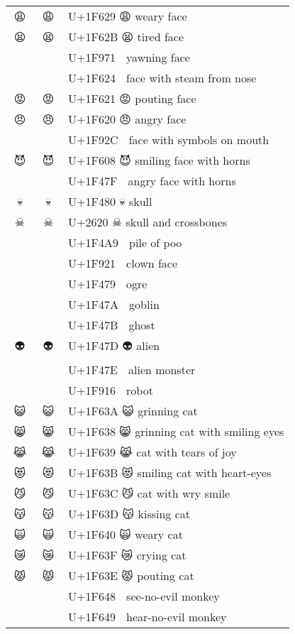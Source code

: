 \documentclass[a4paper,12pt]{article}
\newcommand{\fontA}[1]{{\fontspec[RawFeature={dist,ccmp}]{Segoe UI Emoji} #1}}
\newcommand{\fontB}[1]{{\fontspec[Ligatures=Common,RawFeature={+ccmp}]{Symbola_Hinted.ttf} #1}}
\begin{document}
\begin{longtable}[c]{ccp{0.8\linewidth}}
\fontA{😩}&\fontB{😩}&U+1F629 😩 weary face\\
\fontA{😫}&\fontB{😫}&U+1F62B 😫 tired face\\
\fontA{🥱}&\fontB{🥱}&U+1F971 🥱 yawning face\\
\fontA{😤}&\fontB{😤}&U+1F624 😤 face with steam from nose\\
\fontA{😡}&\fontB{😡}&U+1F621 😡 pouting face\\
\fontA{😠}&\fontB{😠}&U+1F620 😠 angry face\\
\fontA{🤬}&\fontB{🤬}&U+1F92C 🤬 face with symbols on mouth\\
\fontA{😈}&\fontB{😈}&U+1F608 😈 smiling face with horns\\
\fontA{👿}&\fontB{👿}&U+1F47F 👿 angry face with horns\\
\fontA{💀}&\fontB{💀}&U+1F480 💀 skull\\
\fontA{☠}&\fontB{☠}&U+2620 ☠ skull and crossbones\\
\fontA{💩}&\fontB{💩}&U+1F4A9 💩 pile of poo\\
\fontA{🤡}&\fontB{🤡}&U+1F921 🤡 clown face\\
\fontA{👹}&\fontB{👹}&U+1F479 👹 ogre\\
\fontA{👺}&\fontB{👺}&U+1F47A 👺 goblin\\
\fontA{👻}&\fontB{👻}&U+1F47B 👻 ghost\\
\fontA{👽}&\fontB{👽}&U+1F47D 👽 alien\\
\fontA{👾}&\fontB{👾}&U+1F47E 👾 alien monster\\
\fontA{🤖}&\fontB{🤖}&U+1F916 🤖 robot\\
\fontA{😺}&\fontB{😺}&U+1F63A 😺 grinning cat\\
\fontA{😸}&\fontB{😸}&U+1F638 😸 grinning cat with smiling eyes\\
\fontA{😹}&\fontB{😹}&U+1F639 😹 cat with tears of joy\\
\fontA{😻}&\fontB{😻}&U+1F63B 😻 smiling cat with heart-eyes\\
\fontA{😼}&\fontB{😼}&U+1F63C 😼 cat with wry smile\\
\fontA{😽}&\fontB{😽}&U+1F63D 😽 kissing cat\\
\fontA{🙀}&\fontB{🙀}&U+1F640 🙀 weary cat\\
\fontA{😿}&\fontB{😿}&U+1F63F 😿 crying cat\\
\fontA{😾}&\fontB{😾}&U+1F63E 😾 pouting cat\\
\fontA{🙈}&\fontB{🙈}&U+1F648 🙈 see-no-evil monkey\\
\fontA{🙉}&\fontB{🙉}&U+1F649 🙉 hear-no-evil monkey\\

\end{longtable}
\end{document}
